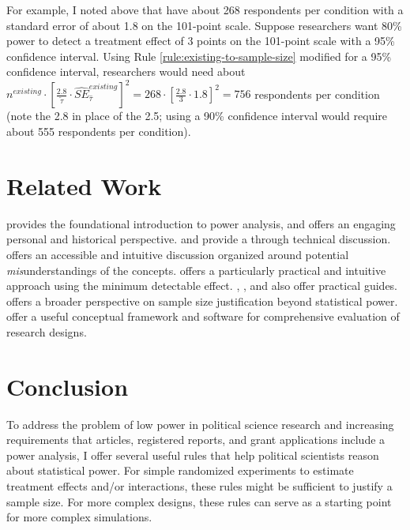 \documentclass[12pt]{article}
\begin{document}
For example, I noted above that \cite{Ahler2018} have about 268 respondents per condition with a standard error of about 1.8 on the 101-point scale. 
Suppose researchers want 80\% power to detect a treatment effect of 3 points on the 101-point scale with a 95\% confidence interval.
Using Rule \ref{rule:existing-to-sample-size} modified for a 95\% confidence interval, researchers would need about $n^{existing} \cdot \left\lbrack \frac{2.8}{\widetilde{\tau}} \cdot {\widehat{SE}}_{\widehat{\tau}}^{existing} \right\rbrack^{2} = 268 \cdot \left\lbrack \frac{2.8}{3} \cdot 1.8 \right\rbrack^{2} = 756$ respondents per condition (note the 2.8 in place of the 2.5; using a 90\% confidence interval would require about 555 respondents per condition).

\section*{Related Work}

\cite{Cohen1988} provides the foundational introduction to power analysis, and \cite{Cohen1990} offers an engaging personal and historical perspective.
\citet[ch. 9]{DeGroot2010} and \citet[ch. 8]{Casella2002} provide a through technical discussion. 
\cite{Greenland2016} offers an accessible and intuitive discussion organized around potential \textit{mis}understandings of the concepts.
\cite{Bloom1995} offers a particularly practical and intuitive approach using the minimum detectable effect.
\cite{Cohen1992}, \cite{Lenth2001}, and \cite{Meyvis2017} also offer practical guides.
\cite{Lakens2022} offers a broader perspective on sample size justification beyond statistical power.
\cite{Blair2019, Blair2023} offer a useful conceptual framework and software for comprehensive evaluation of research designs.

\section*{Conclusion}

To address the problem of low power in political science research \citep{ArelBundock2022} and increasing requirements that articles, registered reports, and grant applications include a power analysis, I offer several useful rules that help political scientists reason about statistical power. 
For simple randomized experiments to estimate treatment effects and/or interactions, these rules might be sufficient to justify a sample size.
For more complex designs, these rules can serve as a starting point for more complex simulations.
\end{document}
